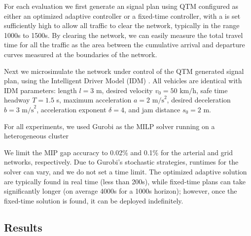 For each evaluation we first generate an signal plan using QTM configured as either an optimized adaptive controller or a fixed-time controller, with a \TMAX is set sufficiently high to allow all traffic to clear the network,
typically in the range 1000s to 1500s.
%
By clearing the network, we can easily measure the total travel time for all the
traffic as the area between the cumulative arrival and departure curves measured
at the boundaries of the network.
%
%
%

Next we microsimulate the network under control of the QTM generated signal plan,
using the Intelligent Driver Model (IDM) \cite{treiber2000congested}. All vehicles are identical with IDM parameters: length $l=3$ m, desired velocity $v_0 = 50 \text{ km/h}$, safe time headway $T=1.5$ s, maximum acceleration
$a=2 \text{ m/s}^2$, desired deceleration $b = 3 \text{ m/s}^2$, acceleration exponent $\delta = 4$, and jam distance $s_0 = 2$ m.


For all experiments, we used Gurobi as the MILP solver running on a
heterogeneous cluster 

We limit the MIP gap accuracy to 0.02\% and 0.1\% for the arterial and grid
networks, respectively.
%
Due to Gurobi's stochastic strategies, runtimes for the solver can vary, and we
do not set a time limit.
%
The optimized adaptive solution are typically found in real time (less than
200s), while fixed-time plans can take significantly longer (on average 4000s
for a 1000s horizon); however, once the fixed-time solution is found, it can be
deployed indefinitely.




\subsection{Results}


